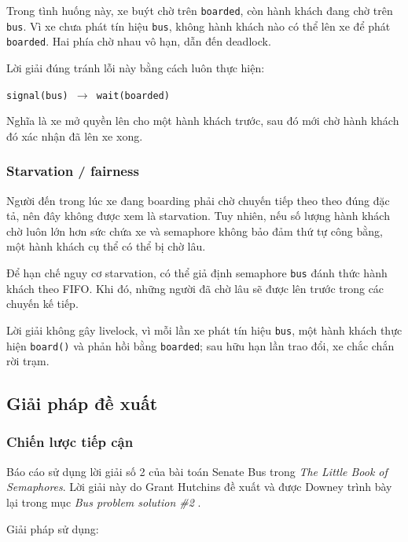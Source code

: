 Trong tình huống này, xe buýt chờ trên \texttt{boarded}, còn hành khách
đang chờ trên \texttt{bus}. Vì xe chưa phát tín hiệu \texttt{bus}, không
hành khách nào có thể lên xe để phát \texttt{boarded}. Hai phía chờ nhau
vô hạn, dẫn đến deadlock.

Lời giải đúng tránh lỗi này bằng cách luôn thực hiện:

\begin{center}
\texttt{signal(bus) $\rightarrow$ wait(boarded)}
\end{center}

Nghĩa là xe mở quyền lên cho một hành khách trước, sau đó mới chờ hành
khách đó xác nhận đã lên xe xong.

\subsubsection*{Starvation / fairness}

Người đến trong lúc xe đang boarding phải chờ chuyến tiếp theo theo
đúng đặc tả, nên đây không được xem là starvation. Tuy nhiên, nếu số
lượng hành khách chờ luôn lớn hơn sức chứa xe và semaphore không bảo đảm
thứ tự công bằng, một hành khách cụ thể có thể bị chờ lâu.

Để hạn chế nguy cơ starvation, có thể giả định semaphore
\texttt{bus} đánh thức hành khách theo FIFO. Khi đó, những người đã chờ
lâu sẽ được lên trước trong các chuyến kế tiếp.

Lời giải không gây livelock, vì mỗi lần xe phát tín hiệu
\texttt{bus}, một hành khách thực hiện \texttt{board()} và phản hồi bằng
\texttt{boarded}; sau hữu hạn lần trao đổi, xe chắc chắn rời trạm.


\subsection{Giải pháp đề xuất}

\subsubsection*{Chiến lược tiếp cận}

Báo cáo sử dụng lời giải số 2 của bài toán Senate Bus trong
\textit{The Little Book of Semaphores}. Lời giải này do Grant Hutchins
đề xuất và được Downey trình bày lại trong mục
\textit{Bus problem solution \#2}
\cite[Sec.~7.4.3, p.~217]{downey2016}.

Giải pháp sử dụng:

